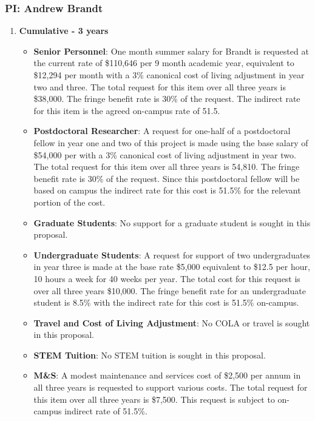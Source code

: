 \subsubsection{\bf PI: Andrew Brandt}

\begin{enumerate}

\item[]{\textbf{Cumulative - 3 years}}

\begin{itemize}[noitemsep,nolistsep]
\item{{\bf Senior Personnel}: One month summer salary for Brandt is requested at the current rate of \$110,646 per 9 month academic year, equivalent to \$12,294 per month with a 3\% canonical cost of living adjustment in year two and three.  The total request for this item over all three years is \$38,000. The fringe benefit rate is 30\% of the request.  The indirect rate for this item is the agreed on-campus rate of 51.5.}

\item {{\bf Postdoctoral Researcher}: A request for one-half of a postdoctoral fellow in year one and two of this project is made using the base salary of \$54,000 per with a 3\% canonical cost of living adjustment in year two. The total request for this item over all three years is 54,810.  The fringe benefit rate is 30\% of the request.  Since this postdoctoral fellow will be based on campus the indirect rate for this cost is 51.5\% for the relevant portion of the cost. } 

\item{{\bf Graduate Students}: No support for a graduate student is sought in this proposal. }

\item {{\bf Undergraduate Students}: A request for support of two undergraduates in year three  is made at the base rate \$5,000 equivalent to \$12.5 per hour, 10 hours a week for 40 weeks per year.  The total cost for this request is over all three years \$10,000.  The fringe benefit rate for an undergraduate student is 8.5\% with the indirect rate for this cost is 51.5\% on-campus.}

\item{{\bf Travel and Cost of Living Adjustment}: No COLA or travel is sought in this proposal.}

\item {{\bf STEM Tuition}: No STEM tuition is sought in this proposal.}

\item {{\bf M\&S}: A modest maintenance and services cost of \$2,500 per annum in all three years is requested to support various costs. The total request for this item over all three years is \$7,500.  This request is subject to on-campus indirect rate of 51.5\%.}


\end{itemize}
\end{enumerate}
